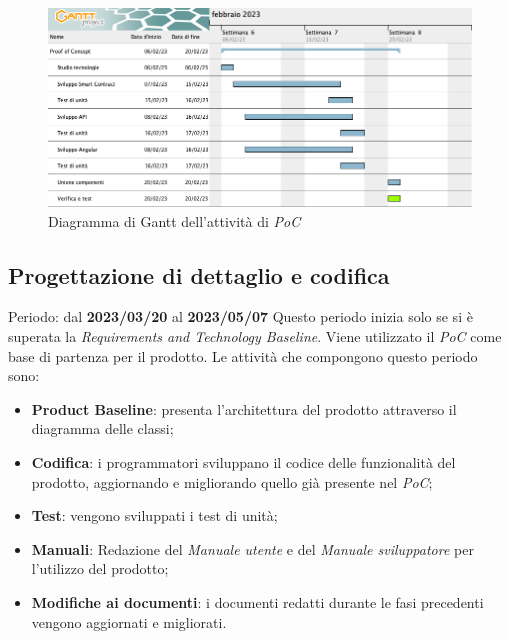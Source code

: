 \begin{figure}[H]
    \centering
    \includegraphics[scale=0.4]{src/img/Gantt PoC.png}
    \caption{Diagramma di Gantt dell'attività di \textit{PoC}}
\end{figure}

\subsection{Progettazione di dettaglio e codifica}
Periodo: dal \textbf{2023/03/20} al \textbf{2023/05/07} \newline
Questo periodo inizia solo se si è superata la \textit{Requirements and Technology Baseline}. Viene utilizzato il \textit{PoC}
come base di partenza per il prodotto. Le attività che compongono questo periodo sono:
\begin{itemize}
    \item \textbf{Product Baseline\glo }: presenta l'architettura del prodotto attraverso il diagramma delle classi;
    \item \textbf{Codifica}: i programmatori sviluppano il codice delle funzionalità del prodotto, aggiornando e migliorando quello già presente nel \textit{PoC};
    \item \textbf{Test}: vengono sviluppati i test di unità;
    \item \textbf{Manuali}: Redazione del \textit{Manuale utente} e del \textit{Manuale sviluppatore} per l'utilizzo del prodotto;
    \item \textbf{Modifiche ai documenti}: i documenti redatti durante le fasi precedenti vengono aggiornati e migliorati.
\end{itemize}

